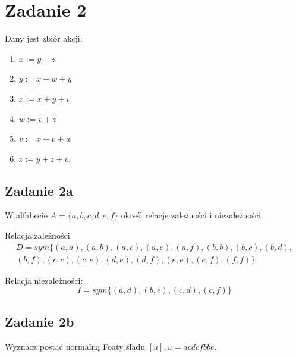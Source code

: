 \documentclass{article}
\begin{document}
\section{Zadanie 2}
Dany jest zbiór akcji:

\begin{enumerate}[label=\alph*)]
    \item
    $x := y + z$
    \item
    $y := x + w + y$
    \item
    $x := x + y + v$
    \item
    $w := v + z$
    \item
    $v := x + v + w$
    \item
    $z := y + z + v$.
\end{enumerate}

\subsection{Zadanie 2a}
W alfabecie $A = \{ a, b, c, d, e, f\}$ określ relacje zależności i niezależności.

Relacja zależności:
\begin{multline*}
D = sym\{ (a,a), (a,b), (a,c), (a,e), (a,f), (b,b), (b,c), (b,d), \\
(b,f), (c,c), (c,e), (d,e), (d,f), (e,e), (e,f), (f,f) \}
\end{multline*}
 
Relacja niezależności:
$$ I = sym\{ (a,d), (b,e), (c,d), (c,f) \} $$

\subsection{Zadanie 2b}
Wyznacz postać normalną Foaty śladu $[u], u = acdcfbbe$.
\end{document}
